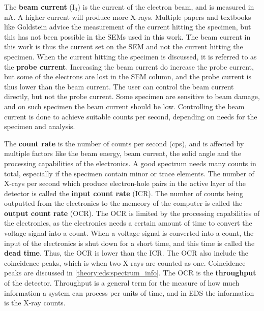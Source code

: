 The \textbf{beam current} (I$_0$) is the current of the electron beam, and is measured in nA.
A higher current will produce more X-rays.
Multiple papers and textbooks like Goldstein advice the measurement of the current hitting the specimen, but this has not been possible in the SEMs used in this work.
The beam current in this work is thus the current set on the SEM and not the current hitting the specimen.
When the current hitting the specimen is discussed, it is referred to as the \textbf{probe current}.
Increasing the beam current do increase the probe current, but some of the electrons are lost in the SEM column, and the probe current is thus lower than the beam current.
The user can control the beam current directly, but not the probe current.
Some specimen are sensitive to beam damage, and on such specimen the beam current should be low.
Controlling the beam current is done to achieve suitable counts per second, depending on needs for the specimen and analysis.


The \textbf{count rate} is the number of counts per second (cps), and is affected by multiple factors like the beam energy, beam current, the solid angle and the processing capabilities of the electronics.
A good spectrum needs many counts in total, especially if the specimen contain minor or trace elements.
The number of X-rays per second which produce electron-hole pairs in the active layer of the detector is called the \textbf{input count rate} (ICR).
The number of counts being outputted from the electronics to the memeory of the computer is called the \textbf{output count rate} (OCR).
The OCR is limited by the processing capabilities of the electronics, as the electronics needs a certain amount of time to convert the voltage signal into a count.
When a voltage signal is converted into a count, the input of the electronics is shut down for a short time, and this time is called the \textbf{dead time}.
Thus, the OCR is lower than the ICR.
The OCR also include the coincidence peaks, which is when two X-rays are counted as one.
Coincidence peaks are discussed in \cref{theory:eds:spectrum_info}.
The OCR is the \textbf{throughput} of the detector.
Throughput is a general term for the measure of how much information a system can process per units of time, and in EDS the information is the X-ray counts.




